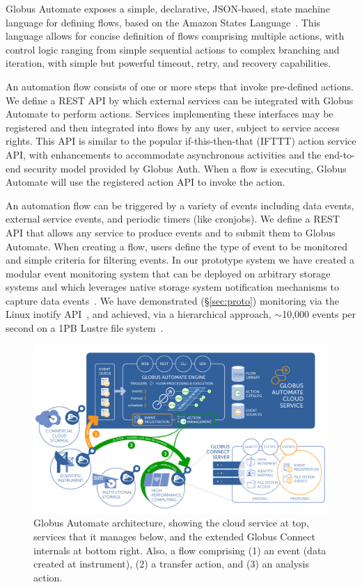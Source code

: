 \documentclass{aip-cp}
\begin{document}
Globus Automate exposes a simple, declarative, JSON-based, state machine 
language for defining flows, 
based on the Amazon States Language~\cite{AmazonStates}. 
This language allows for concise definition of flows comprising multiple actions, with control logic 
ranging from simple sequential actions to complex branching and iteration, with simple but powerful 
timeout, retry, and recovery capabilities. 

An automation flow consists of one or more steps that invoke pre-defined actions. 
We define a REST API by which external services can be integrated with Globus Automate to perform 
actions. 
Services implementing these interfaces may
be registered and then integrated into flows by any user, subject to service access rights. 
This API is similar to the popular if-this-then-that (IFTTT) action service API, 
with enhancements to accommodate asynchronous activities and the end-to-end security model provided 
by Globus Auth. When a flow is executing, Globus Automate will use
the registered action API to invoke the action.

An automation flow can be triggered by a variety of events including 
data events, external service events, and periodic timers (like cronjobs).
We define a REST API that allows any service to produce events
and to submit them to Globus Automate. When creating a flow, 
users define the type of event to be monitored and simple criteria
for filtering events. 
In our prototype system we have created a modular event monitoring system that
can be deployed on arbitrary storage systems and which leverages
native storage system notification mechanisms to capture data events~\cite{chard17ripple}. 
We have demonstrated (\S\ref{sec:proto}) monitoring via the Linux
inotify API~\cite{inotify}, and achieved, via a hierarchical approach, 
$\sim$10,000 events per second on a 1PB Lustre file system~\cite{paul17scalable}.  

\begin{figure}[h]
  \centerline{\includegraphics[width=6in]{Figs/automate.png}}
  \caption{Globus Automate architecture, showing the cloud service at top, services that it
    manages below, and the extended Globus Connect internals at bottom right. Also, a flow
    comprising 
    (1) an event (data created at instrument), (2) a transfer action, and (3) an analysis action.
\label{fig:diffuse}}
\end{figure}
\end{document}

